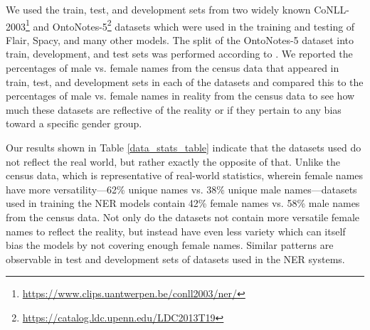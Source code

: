 We used the train, test, and development sets from two widely known CoNLL-2003\footnote{\small{\url{https://www.clips.uantwerpen.be/conll2003/ner/}}} \cite{sang2003introduction} and OntoNotes-5\footnote{\small{\url{https://catalog.ldc.upenn.edu/LDC2013T19}}} \cite{weischedel2012ontonotes} datasets which were used in the training and testing of Flair, Spacy, and many other models. The split of the OntoNotes-5 dataset into train, development, and test sets was performed according to \cite{pradhan2013towards}. We reported the percentages of male vs. female names from the census data that appeared in train, test, and development sets in each of the datasets and compared this to the percentages of male vs. female names in reality from the census data to see how much these datasets are reflective of the reality or if they pertain to any bias toward a specific gender group.

Our results shown in Table \ref{data_stats_table} indicate that the datasets used do not reflect the real world, but rather exactly the opposite of that. Unlike the census data, which is representative of real-world statistics, wherein female names have more versatility---62\% unique names vs. 38\% unique male names---datasets used in training the NER models contain 42\% female names vs. 58\% male names from the census data. Not only do the datasets not contain more versatile female names to reflect the reality,  but instead have even less variety which can itself bias the models by not covering enough female names. Similar patterns are observable in test and development sets of datasets used in the NER systems.


